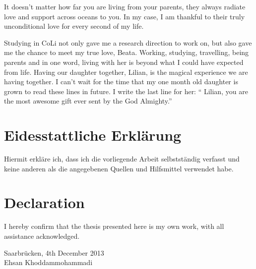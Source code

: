 It doesn't matter how far you are living from your parents, they always radiate
love and support across oceans to you. In my case, I am thankful to their truly
unconditional love for every second of my life. 

Studying in CoLi not only gave me a research direction to work on, but also
gave me the chance to meet my true love, Beata. Working, studying, travelling,
being parents and in one word, living with her is beyond what I could have
expected from life.
Having our daughter together, Lilian, is the magical
experience we are having together. I can't wait for the time that my one
month old daughter is grown to read these lines in future. I write the last line
for her: `` Lilian, you are the most awesome gift ever sent by the God
Almighty.''




\newpage

\section*{Eidesstattliche Erkl\"{a}rung}
Hiermit erkl\"{a}re ich, dass ich die vorliegende Arbeit selbstst\"{a}ndig
verfasst und keine anderen als die angegebenen Quellen und Hilfsmittel
verwendet habe.

\vspace{2cm}
\section*{Declaration}
I hereby confirm that the thesis presented here is my own work, with all
assistance acknowledged.


\vspace{4cm}
Saarbr\"{u}cken, 4th December 2013\\
Ehsan Khoddammohammadi 

